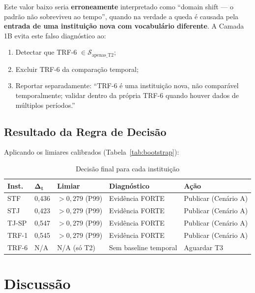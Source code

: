 \documentclass[12pt,a4paper]{article}
\theoremstyle{remark}
\begin{document}
Este valor baixo seria \textbf{erroneamente} interpretado como ``domain shift — o padrão não sobreviveu ao tempo'', quando na verdade a queda é causada pela \textbf{entrada de uma instituição nova com vocabulário diferente}. A Camada 1B evita este falso diagnóstico ao:
\begin{enumerate}[nosep]
  \item Detectar que TRF-6 $\in \mathcal{S}_{\text{apenas\_T2}}$;
  \item Excluir TRF-6 da comparação temporal;
  \item Reportar separadamente: ``TRF-6 é uma instituição nova, não comparável temporalmente; validar dentro da própria TRF-6 quando houver dados de múltiplos períodos.''
\end{enumerate}

\subsection{Resultado da Regra de Decisão}

Aplicando os limiares calibrados (Tabela~\ref{tab:bootstrap}):

\begin{table}[H]\centering\footnotesize
\caption{Decisão final para cada instituição}
\label{tab:decisao_final}
\begin{tabular}{p{}p{}p{}p{}p{}}
\toprule
\textbf{Inst.} & $\mathbf{\Delta_t}$ & \textbf{Limiar} & \textbf{Diagnóstico} & \textbf{Ação} \\
\midrule
STF   & 0,436 & $> 0,279$ (P99) & Evidência FORTE & Publicar (Cenário A) \\
STJ   & 0,423 & $> 0,279$ (P99) & Evidência FORTE & Publicar (Cenário A) \\
TJ-SP & 0,547 & $> 0,279$ (P99) & Evidência FORTE & Publicar (Cenário A) \\
TRF-1 & 0,545 & $> 0,279$ (P99) & Evidência FORTE & Publicar (Cenário A) \\
TRF-6 & N/A  & N/A (só T2)  & Sem baseline temporal & Aguardar T3 \\
\bottomrule
\end{tabular}
\end{table}

\newpage

\section{Discussão}
\end{document}
